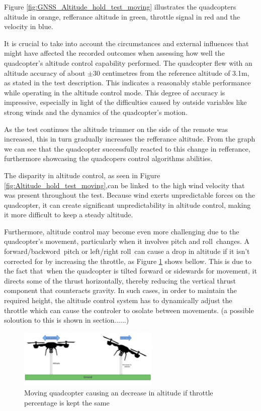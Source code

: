 \documentclass{report}
\begin{document}
Figure \ref{fig:GNSS_Altitude_hold_test_moving} illustrates the quadcopters
altitude in orange, refferance altitude in green, throttle signal in red and the
velocity in blue.

It is crucial to take into account the circumstances and external influences
that might have affected the recorded outcomes when assessing how well the
quadcopter's altitude control capability performed. The quadcopter flew with an
altitude accuracy of about \(\pm30\) centimetres from the reference altitude of
3.1m, as stated in the test description. This indicates a reasonably stable
performance while operating in the altitude control mode. This degree of
accuracy is impressive, especially in light of the difficulties caused by
outside variables like strong winds and the dynamics of the quadcopter's motion.

As the test continues the altitude trimmer on the side of the remote was
increased, this in turn gradually increases the refferance altitude. From the
graph we can see that the quadcopter successfully reacted to this change in
refferance, furthermore showcasing the quadcopers control algorithms abilities.

The disparity in altitude control, as seen in
Figure \ref{fig:Altitude_hold_test_moving},can be linked to the high wind
velocity that was present throughout the test. Because wind exerts unpredictable
forces on the quadcopter, it can create significant unpredictability in altitude
control, making it more difficult to keep a steady altitude.

Furthermore, altitude control may become even more challenging due to the
quadcopter's movement, particularly when it involves pitch and roll changes. A
forward/backword pitch or left/right roll can cause a drop in altitude if it
isn't corrected for by increasing the throttle, as
Figure \ref{fig:ToF_altitude_error} shows bellow. This is due to the fact
that when the quadcopter is tilted forward or sidewards for movement, it directs
some of the thrust horizontally, thereby reducing the vertical thrust component
that counteracts gravity. In such cases, in order to maintain the required
height, the altitude control system has to dynamically adjust the throttle which
can cause the controler to osolate between movements. (a possible soloution to
this is shown in section......)

\begin{figure}[H]
  \centering
  \includegraphics[width=0.6\textwidth]{Pictures/ToF_altitude_error.png}
  \caption{Moving quadcopter causing an decrease in altitude if throttle percentage is kept the same}
  \label{fig:ToF_altitude_error}
\end{figure}
\end{document}
